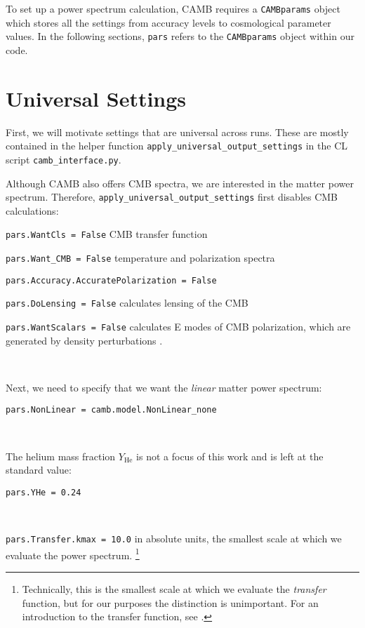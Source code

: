 
To set up a power spectrum calculation, CAMB requires a
\verb|CAMBparams| object which stores all the settings from accuracy levels
to cosmological parameter values. In the following sections, \verb|pars| 
refers to the \verb|CAMBparams| object within our code.

\section{Universal Settings}

First, we will motivate settings that are universal across runs. These are 
mostly 
contained in the helper function \verb|apply_universal_output_settings| in the 
CL script \verb|camb_interface.py|.

Although CAMB also offers CMB spectra, we are interested in the
matter power spectrum. Therefore, \verb|apply_universal_output_settings|  
first disables CMB calculations:

\verb|pars.WantCls = False| \quad CMB transfer function

\verb|pars.Want_CMB = False| \quad temperature and polarization spectra

\verb|pars.Accuracy.AccuratePolarization = False|

\verb|pars.DoLensing = False| \quad calculates lensing of the CMB

\verb|pars.WantScalars = False| \quad calculates E modes of CMB polarization, 
which are generated by density perturbations .

\

Next, we need to specify that we want the \textit{linear} matter power 
spectrum:

\verb|pars.NonLinear = camb.model.NonLinear_none|


\

The helium mass fraction $Y_\text{He}$ is not a focus of this work and is left
at the standard value:

\verb|pars.YHe = 0.24| \quad {}

\


\verb|pars.Transfer.kmax = 10.0| \quad in absolute units,
the smallest scale at which we evaluate the power spectrum.
\footnote{Technically, this is the smallest scale at which we evaluate the
\textit{transfer} function, but for our purposes the distinction is
unimportant. For an introduction to the transfer function, see \citet{FECS}.} 

